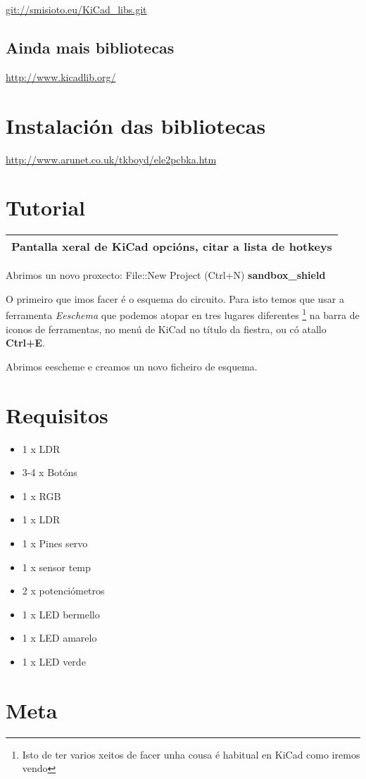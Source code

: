 \url{git://smisioto.eu/KiCad_libs.git}

\subsection{Ainda mais bibliotecas}\label{ainda-mais-bibliotecas}

\url{http://www.kicadlib.org/}

\section{Instalación das
bibliotecas}\label{instalaciuxf3n-das-bibliotecas}

\url{http://www.arunet.co.uk/tkboyd/ele2pcbka.htm}

\section{Tutorial}\label{tutorial}

\begin{longtable}[c]{@{}l@{}}
\toprule
Pantalla xeral de KiCad opcións, citar a lista de hotkeys\tabularnewline
\bottomrule
\end{longtable}

Abrimos un novo proxecto: File::New Project (Ctrl+N)
\textbf{sandbox\_shield}

O primeiro que imos facer é o esquema do circuito. Para isto temos que
usar a ferramenta \emph{Eeschema} que podemos atopar en tres lugares
diferentes \footnote{Isto de ter varios xeitos de facer unha cousa é
  habitual en KiCad como iremos vendo} na barra de iconos de
ferramentas, no menú de KiCad no título da fiestra, ou có atallo
\textbf{Ctrl+E}.

Abrimos eescheme e creamos un novo ficheiro de esquema.

\section{Requisitos}\label{requisitos}

\begin{itemize}
\itemsep1pt\parskip0pt
\item
  1 x LDR
\item
  3-4 x Botóns
\item
  1 x RGB
\item
  1 x LDR
\item
  1 x Pines servo
\item
  1 x sensor temp
\item
  2 x potenciómetros
\item
  1 x LED bermello
\item
  1 x LED amarelo
\item
  1 x LED verde
\end{itemize}

\section{Meta}\label{meta}
